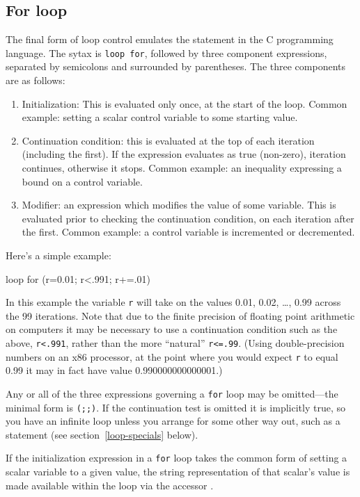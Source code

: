 \subsection{For loop}
\label{loop-for}

The final form of loop control emulates the  statement in the
C programming language.  The sytax is \texttt{loop for}, followed by
three component expressions, separated by semicolons and surrounded by
parentheses.  The three components are as follows:

\begin{enumerate}
\item Initialization: This is evaluated only once, at the start of the
  loop.  Common example: setting a scalar control variable to some
  starting value.
\item Continuation condition: this is evaluated at the top of each
  iteration (including the first).  If the expression evaluates as
  true (non-zero), iteration continues, otherwise it stops. Common
  example: an inequality expressing a bound on a control variable.
\item Modifier: an expression which modifies the value of
  some variable.  This is evaluated prior to checking the
  continuation condition, on each iteration after the first.
  Common example: a control variable is incremented or
  decremented.
\end{enumerate}

Here's a simple example:
%
\begin{code}
loop for (r=0.01; r<.991; r+=.01)
\end{code}

In this example the variable \verb+r+ will take on the values 0.01,
0.02, \dots{}, 0.99 across the 99 iterations.  Note that due to the
finite precision of floating point arithmetic on computers it may be
necessary to use a continuation condition such as the above,
\verb+r<.991+, rather than the more ``natural'' \verb+r<=.99+.  (Using
double-precision numbers on an x86 processor, at the point where you
would expect \verb+r+ to equal 0.99 it may in fact have value
0.990000000000001.)

Any or all of the three expressions governing a \texttt{for} loop may
be omitted---the minimal form is \texttt{(;;)}.  If the continuation
test is omitted it is implicitly true, so you have an infinite loop
unless you arrange for some other way out, such as a 
statement (see section~\ref{loop-specials} below).

If the initialization expression in a \texttt{for} loop takes the
common form of setting a scalar variable to a given value, the string
representation of that scalar's value is made available within
the loop via the accessor .

